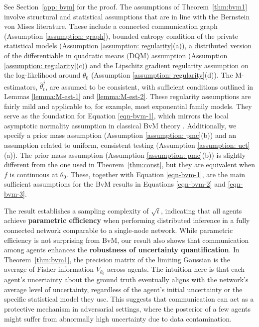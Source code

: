 \documentclass[twoside,11pt]{article}
\numberwithin{equation}{section}
\begin{document}
{See Section~\ref{app: bvm} for the proof. 
The assumptions of Theorem~\ref{thm:bvm1} involve structural and statistical assumptions that are in line with the Bernstein von Mises literature. These include a connected communication graph (Assumption \ref{assumption: graph}), bounded entropy condition of the private statistical models (Assumption \ref{assumption: regularity}(a)), a distributed version of the differentiable in quadratic means (DQM) assumption (Assumption \ref{assumption: regularity}(c)) and the Lipschitz gradient regularity assumption on the log-likelihood around $\theta_0$ (Assumption \ref{assumption: regularity}(d)). The M-estimators, $\hat \theta_t^j$, are assumed to be consistent, with sufficient conditions outlined in Lemmas \ref{lemma:M-est-1} and \ref{lemma:M-est-2}. These regularity assumptions are fairly mild and applicable to, for example, most exponential family models. They serve as the foundation for Equation \eqref{eqn-bvm-1}, which mirrors the local asymptotic normality assumption in classical BvM theory \citep{LeCam2000}. Additionally, we specify a prior mass assumption (Assumption \ref{assumption: pmc}(b)) and an assumption related to uniform, consistent testing (Assumption \ref{assumption: uct}(a)). The prior mass assumption (Assumption \ref{assumption: pmc}(b)) is slightly different from the one used in Theorem~\ref{thm:const}, but they are equivalent when $f$ is continuous at $\theta_0$. These, together with Equation \eqref{eqn-bvm-1}, are the main sufficient assumptions for the BvM results in Equations \eqref{eqn-bvm-2} and \eqref{eqn-bvm-3}.

The result establishes a sampling complexity of $\sqrt{t}$, indicating that all agents achieve \textbf{parametric efficiency} when performing distributed inference in a fully connected network comparable to a single-node network. While parametric efficiency is not surprising from BvM, our result also shows that communication among agents enhances the \textbf{robustness of uncertainty quantification}. In Theorem~\ref{thm:bvm1}, the precision matrix of the limiting Gaussian is the average of Fisher information $V_{\theta_0}$ across agents. The intuition here is that each agent’s uncertainty about the ground truth eventually aligns with the network’s average level of uncertainty, regardless of the agent’s initial uncertainty or the specific statistical model they use. This suggests that communication can act as a protective mechanism in adversarial settings, where the posterior of a few agents might suffer from abnormally high uncertainty due to data contamination.

}
\end{document}
